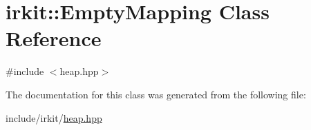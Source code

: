 \hypertarget{classirkit_1_1EmptyMapping}{}\section{irkit\+:\+:Empty\+Mapping Class Reference}
\label{classirkit_1_1EmptyMapping}


{\ttfamily \#include $<$heap.\+hpp$>$}



The documentation for this class was generated from the following file\+:\begin{DoxyCompactItemize}
\item 
include/irkit/\hyperlink{heap_8hpp}{heap.\+hpp}\end{DoxyCompactItemize}
